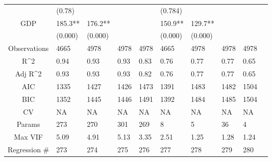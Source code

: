 \documentclass{article}
\begin{document}
\begin{table}[H]
\begin{tabular}{|clllllllll|}
   & (0.78) &  &  &  & (0.784) &  &  &  & \\
  GDP & 185.3** & 176.2** &  &  & 150.9** & 129.7** &  &  & \\
   & (0.000) & (0.000) &  &  & (0.000) & (0.000) &  &  & \\
  \hline
 Observations & 4665 & 4978 & 4978 & 4978 & 4665 & 4978 & 4978 & 4978 & \\
  R^2 & 0.94 & 0.93 & 0.93 & 0.83 & 0.76 & 0.77 & 0.77 & 0.65 & \\
  Adj R^2 & 0.93 & 0.93 & 0.93 & 0.82 & 0.76 & 0.77 & 0.77 & 0.65 & \\
  AIC & 1335 & 1427 & 1426 & 1473 & 1391 & 1483 & 1482 & 1504 & \\
  BIC & 1352 & 1445 & 1446 & 1491 & 1392 & 1484 & 1485 & 1504 & \\
  CV & NA & NA & NA & NA & NA & NA & NA & NA & \\
  Params & 273 & 270 & 301 & 269 & 8 & 5 & 36 & 4 & \\
  Max VIF & 5.09 & 4.91 & 5.13 & 3.35 & 2.51 & 1.25 & 1.28 & 1.24 & \\
  Regression \# & 273 & 274 & 275 & 276 & 277 & 278 & 279 & 280 & \\
   \hline
\end{tabular}

\end{table}
\end{document}
